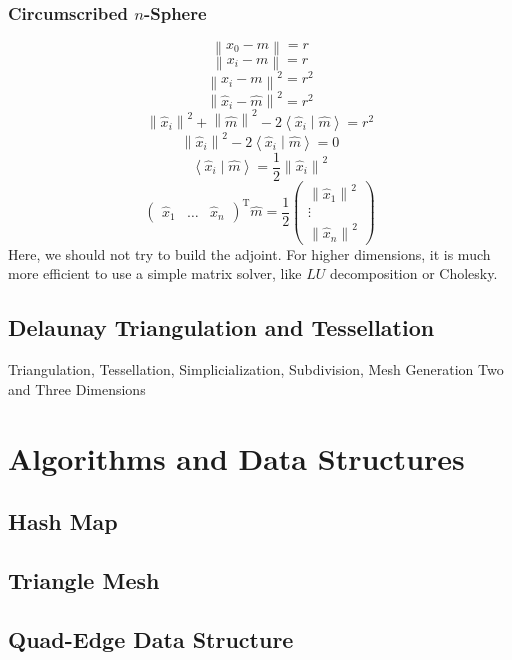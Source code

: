 \documentclass[10pt, twoside, fleqn]{article}
\let\oldsection\section
\renewcommand*\section{%
  \cleardoublepage
  \thispagestyle{sectionstyle}\oldsection}
\newcommand{\norm}[1]{\left\| #1 \right\|}
\newcommand{\scalarproduct}[2]{\left\langle #1 \middle| #2 \right\rangle}
\begin{document}
      \subsubsection{Circumscribed $n$-Sphere}
        \[
          \norm{x_0 - m} = r
        \]
        \[
          \norm{x_i - m} = r
        \]
        \[
          \norm{x_i - m}^2 = r^2
        \]
        \[
          \norm{\hat{x}_i - \hat{m}}^2 = r^2
        \]
        \[
          \norm{\hat{x}_i}^2 + \norm{\hat{m}}^2 - 2 \scalarproduct{\hat{x}_i}{\hat{m}} = r^2
        \]
        \[
          \norm{\hat{x}_i}^2 - 2 \scalarproduct{\hat{x}_i}{\hat{m}} = 0
        \]
        \[
          \scalarproduct{\hat{x}_i}{\hat{m}} = \frac{1}{2}\norm{\hat{x}_i}^2
        \]
        \[
          \begin{pmatrix}
            \hat{x}_1 & \ldots & \hat{x}_n
          \end{pmatrix}
          ^\mathrm{T}
          \hat{m}
          = \frac{1}{2}
          \begin{pmatrix}
            \norm{\hat{x}_1}^2 \\
            \vdots \\
            \norm{\hat{x}_n}^2
          \end{pmatrix}
        \]
        Here, we should not try to build the adjoint.
        For higher dimensions, it is much more efficient to use a simple matrix solver, like $LU$ decomposition or Cholesky.

    \subsection{Delaunay Triangulation and Tessellation}
      Triangulation, Tessellation, Simplicialization, Subdivision, Mesh Generation
      Two and Three Dimensions
  \section{Algorithms and Data Structures}
    \subsection{Hash Map}
    \subsection{Triangle Mesh}
    \subsection{Quad-Edge Data Structure}
\end{document}
